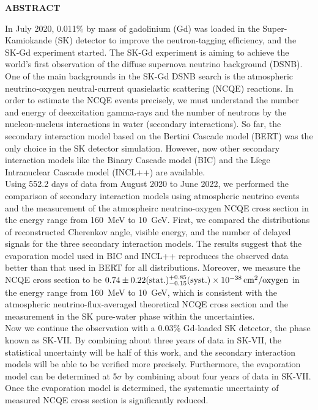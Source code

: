 

\begin{center}
	{\LARGE\bfseries ABSTRACT}
\end{center}
\vs\hs
In July 2020, 0.011\% by mass of gadolinium (Gd) was loaded in the Super-Kamiokande (SK) detector to improve the neutron-tagging efficiency, and the SK-Gd experiment started.
The SK-Gd experiment is aiming to achieve the world's first observation of the diffuse supernova neutrino background (DSNB).
One of the main backgrounds in the SK-Gd DSNB search is the atmospheric neutrino-oxygen neutral-current quasielastic scattering (NCQE) reactions.
In order to estimate the NCQE events precisely, we must understand the number and energy of deexcitation gamma-rays and the number of neutrons by the nucleon-nucleus interactions in water (secondary interactions).
So far, the secondary interaction model based on the Bertini Cascade model (BERT) was the only choice in the SK detector simulation.
However, now other secondary interaction models like the Binary Cascade model (BIC) and the Li$\grave{\text{e}}$ge Intranuclear Cascade model (INCL++) are available.\\
\hs
Using 552.2 days of data from August 2020 to June 2022, we performed the comparison of secondary interaction models using atmospheric neutrino events and the measurement of the atmospheirc neutrino-oxygen NCQE cross section in the energy range from 160~MeV to 10~GeV.
First, we compared the distributions of reconstructed Cherenkov angle, visible energy, and the number of delayed signals for the three secondary interaction models.
The results suggest that the evaporation model used in BIC and INCL++ reproduces the observed data better than that used in BERT for all distributions.
Moreover, we measure the NCQE cross section to be $0.74 \pm 0.22({\rm stat.})^{+0.85}_{-0.15}({\rm syst.}) \times 10^{-38}\,{\rm cm}^{2}/{\rm oxygen}$ in the energy range from 160~MeV to 10~GeV, which is consistent with the atmospheric neutrino-flux-averaged theoretical NCQE cross section and the measurement in the SK pure-water phase within the uncertainties.\\
\hs
Now we continue the observation with a 0.03\% Gd-loaded SK detector, the phase known as SK-VII.
By combining about three years of data in SK-VII, the statistical uncertainty will be half of this work, and the secondary interaction models will be able to be verified more precisely.
Furthermore, the evaporation model can be determined at 5$\sigma$ by combining about four years of data in SK-VII.
Once the evaporation model is determined, the systematic uncertainty of measured NCQE cross section is significantly reduced.
\thispagestyle{empty}
\clearpage

